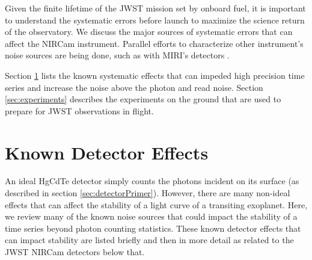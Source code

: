 \documentclass{aastex62}
\begin{document}
Given the finite lifetime of the JWST mission set by onboard fuel, it is important to understand the systematic errors before launch to maximize the science return of the observatory.
We discuss the major sources of systematic errors that can affect the NIRCam instrument.
Parallel efforts to characterize other instrument's noise sources are being done, such as with MIRI's detectors \citep{matuso2019siAsDetectorStability}.

Section \ref{sec:knownEffects} lists the known systematic effects that can impeded high precision time series and increase the noise above the photon and read noise.
Section \ref{sec:experiments} describes the experiments on the ground that are used to prepare for JWST observations in flight.


\section{Known Detector Effects}\label{sec:knownEffects}
An ideal HgCdTe detector simply counts the photons incident on its surface (as described in section \ref{sec:detectorPrimer}).
However, there are many non-ideal effects that can affect the stability of a light curve of a transiting exoplanet.
Here, we review many of the known noise sources that could impact the stability of a time series beyond photon counting statistics. These known detector effects that can impact stability are listed briefly and then in more detail as related to the JWST NIRCam detectors below that.
\end{document}
